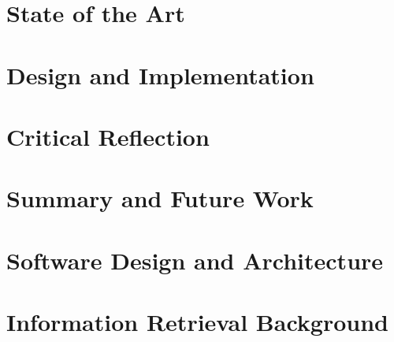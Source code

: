 \documentclass[draft,final]{vutinfth} %
\begin{document}



\chapter{State of the Art}
\label{ch:state-of-the-art}




\chapter{Design and Implementation}
\label{ch:design+impl}




\chapter{Critical Reflection}
\label{ch:reflection}




\chapter{Summary and Future Work}
\label{ch:summary}




\appendix

\chapter{Software Design and Architecture}
\label{ch:appendix-a}




\chapter{Information Retrieval Background}
\label{ch:appendix-b}


\end{document}
